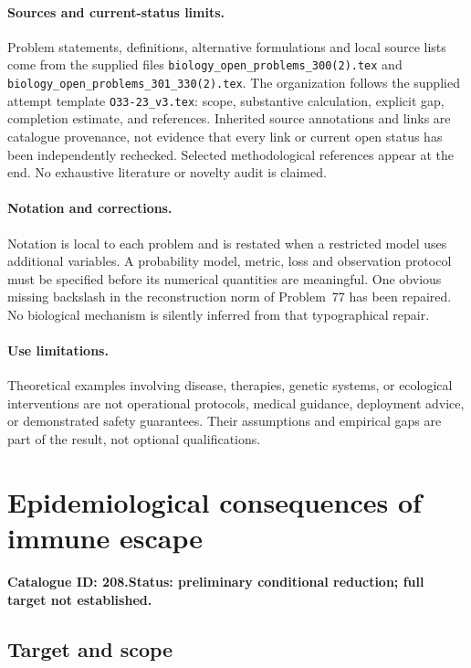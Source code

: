 \documentclass[11pt]{article}
\begin{document}
\paragraph{Sources and current-status limits.}
Problem statements, definitions, alternative formulations and local source lists
come from the supplied files
\texttt{biology\_open\_problems\_300(2).tex} and
\texttt{biology\_open\_problems\_301\_330(2).tex}.
The organization follows the supplied attempt template
\texttt{O33-23\_v3.tex}: scope, substantive calculation, explicit gap,
completion estimate, and references. Inherited source annotations and links are
catalogue provenance, not evidence that every link or current open status has
been independently rechecked. Selected methodological references appear at the
end. No exhaustive literature or novelty audit is claimed.

\paragraph{Notation and corrections.}
Notation is local to each problem and is restated when a restricted model uses
additional variables. A probability model, metric, loss and observation protocol
must be specified before its numerical quantities are meaningful. One obvious
missing backslash in the reconstruction norm of Problem~77 has been repaired.
No biological mechanism is silently inferred from that typographical repair.

\paragraph{Use limitations.}
Theoretical examples involving disease, therapies, genetic systems, or ecological
interventions are not operational protocols, medical guidance, deployment advice,
or demonstrated safety guarantees. Their assumptions and empirical gaps are part
of the result, not optional qualifications.

\setcounter{section}{207}
\section{Epidemiological consequences of immune escape}
\label{prob:208}
\noindent\textbf{Catalogue ID: 208.}\quad \textbf{Status: preliminary conditional reduction; full target not established.}
\subsection{Target and scope}
\end{document}
